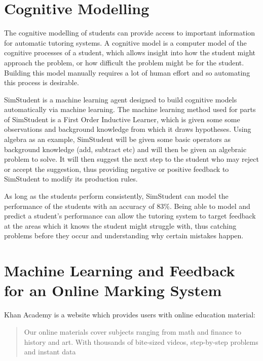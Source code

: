 \section{Cognitive Modelling}
The cognitive modelling of students can provide access to important information for automatic tutoring systems. A cognitive model is a computer model of the cognitive processes of a student, which allows insight into how the student might approach the problem, or how difficult the problem might be for the student. Building this model manually requires a lot of human effort\cite{simstudent_better} and so automating this process is desirable.

SimStudent is a machine learning agent designed to build cognitive models automatically via machine learning. The machine learning method used for parts of SimStudent is a First Order Inductive Learner, which is given some some observations and background knowledge from which it draws hypotheses. Using algebra as an example, SimStudent will be given some basic operators as background knowledge (add, subtract etc) and will then be given an algebraic problem to solve. It will then suggest the next step to the student who may reject or accept the suggestion, thus providing negative or positive feedback to SimStudent to modify its production rules.

As long as the students perform consistently, SimStudent can model the performance of the students with an accuracy of 83\%\cite{simstudent}. Being able to model and predict a student's performance can allow the tutoring system to target feedback at the areas which it knows the student might struggle with, thus catching problems before they occur and understanding why certain mistakes happen.

\section{Machine Learning and Feedback for an Online Marking System}
Khan Academy\cite{khan_site} is a website which provides users with online education material:
\begin{quote}
Our online materials cover subjects ranging from math and finance to history and art.  With thousands of bite-sized videos, step-by-step problems and instant data\cite{ka_faq}
\end{quote}

